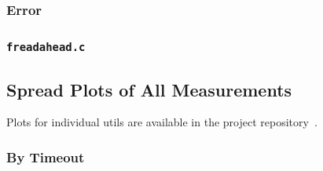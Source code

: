 \documentclass{article}
\let\savedCite=\cite
\renewcommand{\cite}{\unskip~\savedCite}
\begin{document}
\subsubsection{Error}


\subsubsection{\texorpdfstring{\lstinline{freadahead.c}}{freadahead.c}}


\clearpage
\subsection{Spread Plots of All Measurements}
\label{AppendixPlots}

Plots for individual utils are available in the project repository\cite{GitHub}.

\subsubsection{By Timeout}
\end{document}
